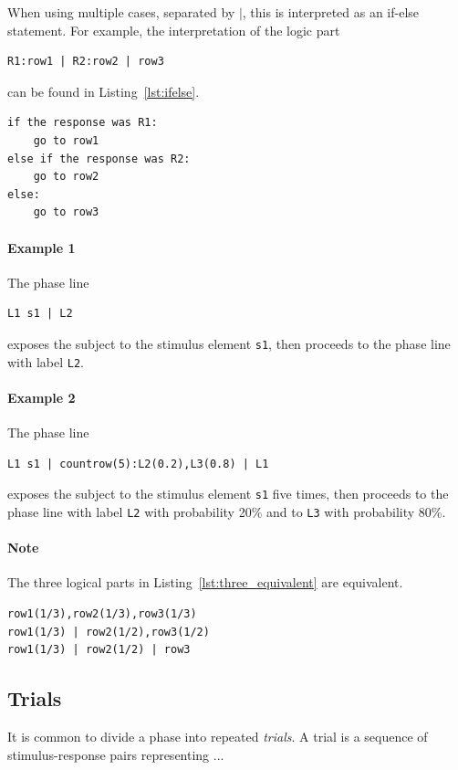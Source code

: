 \documentclass[11pt]{article}
\begin{document}
When using multiple cases, separated by $|$, this is interpreted as an if-else statement.
For example, the interpretation of the logic part
\begin{verbatim}
R1:row1 | R2:row2 | row3
\end{verbatim}
can be found in Listing~\ref{lst:ifelse}.
\begin{lstlisting}[caption={Interpretation of \texttt{ R1:row1 $|$ R2:row2 $|$ row3}}, label={lst:ifelse}]
if the response was R1:
    go to row1
else if the response was R2:
    go to row2
else:
    go to row3
\end{lstlisting}

\paragraph{Example 1}The phase line
\begin{verbatim}
L1 s1 | L2
\end{verbatim}
exposes the subject to the stimulus element \verb|s1|, then proceeds to the phase line with label \verb|L2|.

\paragraph{Example 2}The phase line
\begin{verbatim}
L1 s1 | countrow(5):L2(0.2),L3(0.8) | L1
\end{verbatim}
exposes the subject to the stimulus element \verb|s1| five times, then proceeds to the phase line with label \verb|L2| with probability 20\% and to \verb|L3| with probability 80\%.

\paragraph{Note}
The three logical parts in Listing~\ref{lst:three_equivalent} are equivalent.
\begin{lstlisting}[caption={Three equivalent logical parts}, label={lst:three_equivalent}]
row1(1/3),row2(1/3),row3(1/3)
row1(1/3) | row2(1/2),row3(1/2)
row1(1/3) | row2(1/2) | row3
\end{lstlisting}

\subsection{Trials}
\label{sec:start_trial}
It is common to divide a phase into repeated \emph{trials}. A trial is a sequence of stimulus-response pairs representing ...
\end{document}
